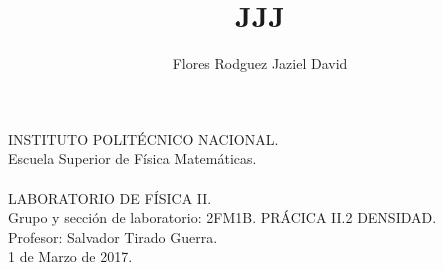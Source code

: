 \documentclass[12pt,a4paper]{article}
\author{Flores Rodguez Jaziel David }
\title{JJJ}
\begin{document}
\centering
INSTITUTO POLIT\'{E}CNICO NACIONAL.\\
Escuela Superior de F\'{i}sica  Matem\'{a}ticas.\\
\\
LABORATORIO DE F\'{I}SICA II.\\
Grupo y secci\'{o}n de laboratorio: 2FM1B.
PR\'{A}CICA II.2 DENSIDAD.\\
Profesor: Salvador Tirado Guerra.\\
1 de Marzo de 2017.\\
\end{document}
